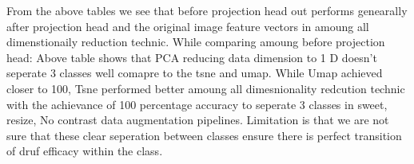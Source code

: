 From the above tables we see that before projection head out performs genearally after projection head and the original image feature vectors in amoung all dimenstionaily reduction technic.
While comparing amoung before projection head: Above table shows that PCA reducing data dimension to 1 D doesn't seperate 3 classes well comapre to the tsne and umap. While Umap achieved closer to 100, Tsne performed better amoung all dimesnionality redcution technic  with the achievance of 100 percentage accuracy to seperate 3 classes in sweet, resize, No contrast data augmentation pipelines. Limitation is that we are not sure that these clear seperation between classes ensure there is perfect transition of druf efficacy within the class.